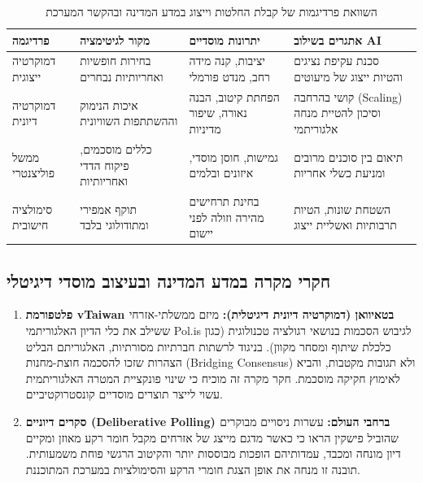 \begin{table}[htbp]
\centering
\caption{השוואת פרדיגמות של קבלת החלטות וייצוג במדע המדינה ובהקשר המערכת}
\label{tab:polsci-paradigms}
\begin{tabular}{|p{2.9cm}|p{3.6cm}|p{4.0cm}|p{4.1cm}|}
\hline
\textbf{פרדיגמה} & \textbf{מקור לגיטימציה} & \textbf{יתרונות מוסדיים} & \textbf{אתגרים בשילוב AI} \\
\hline
דמוקרטיה ייצוגית \cite{dahl1989democracy, pitkin1967concept} & בחירות חופשיות ואחריותיות נבחרים & יציבות, קנה מידה רחב, מנדט פורמלי & סכנת עקיפת נציגים והטיות ייצוג של מיעוטים \\
\hline
דמוקרטיה דיונית \cite{habermas1989structural, fishkin2018democracy} & איכות הנימוק וההשתתפות השוויונית & הפחתת קיטוב, הבנה נאורה, שיפור מדיניות & קושי בהרחבה (Scaling) וסיכון להטיית מנחה אלגוריתמי \\
\hline
ממשל פוליצנטרי \cite{ostrom1990governing} & כללים מוסכמים, פיקוח הדדי ואחריותיות & גמישות, חוסן מוסדי, איזונים ובלמים & תיאום בין סוכנים מרובים ומניעת כשלי אחריות \\
\hline
סימולציה חישובית \cite{argyle2023out, bisbee2024synthetic} & תוקף אמפירי ומתודולוגי בלבד & בחינת תרחישים מהירה וזולה לפני יישום & השטחת שונות, הטיות תרבותיות ואשליית ייצוג \\
\hline
\end{tabular}
\end{table}

\subsection{חקרי מקרה במדע המדינה ובעיצוב מוסדי דיגיטלי}
\begin{enumerate}
    \item \textbf{פלטפורמת vTaiwan בטאיוואן (דמוקרטיה דיונית דיגיטלית):} מיזם ממשלתי-אזרחי ששילב את כלי הדיון האלגוריתמי Pol.is לגיבוש הסכמות בנושאי רגולציה טכנולוגית (כגון כלכלת שיתוף ומסחר מקוון). בניגוד לרשתות חברתיות מסורתיות, האלגוריתם הבליט הצהרות שזכו להסכמה חוצת-מחנות (Bridging Consensus) ולא תגובות מקטבות, והביא לאימוץ חקיקה מוסכמת. חקר מקרה זה מוכיח כי שינוי פונקציית המטרה האלגוריתמית עשוי לייצר תוצרים מוסדיים קונסטרוקטיביים.
    \item \textbf{סקרים דיוניים (Deliberative Polling) ברחבי העולם:} עשרות ניסויים מבוקרים שהוביל פישקין \cite{fishkin2018democracy} הראו כי כאשר מדגם מייצג של אזרחים מקבל חומר רקע מאוזן ומקיים דיון מונחה ומכבד, עמדותיהם הופכות מבוססות יותר והקיטוב הרגשי פוחת משמעותית. תובנה זו מנחה את אופן הצגת חומרי הרקע והסימולציות במערכת המתוכננת.
\end{enumerate}

